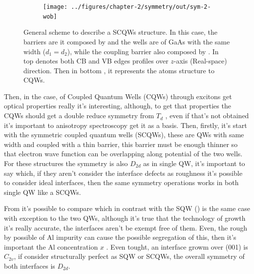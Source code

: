 \begin{figure}[h!]
	\centering
	\begin{subfigure}{\textwidth}
		\texttt{[image: ../figures/chapter-2/symmetry/out/sym-2-wob]}
		\label{subfig:subsubsec:chapter-2-scoupled-quantum-wells-a}
		\label{subfig:subsubsec:chapter-2-scoupled-quantum-wells-b}
	\end{subfigure}
	\caption
	{
		General scheme to describe a SCQWs structure. In this case, the barriers are it composed by \algaas and the wells are of GaAs with the same width ($d_{1}=d_{2}$), while the coupling barrier also composed by \algaas. In top  denotes both  CB and VB  edges profiles over $z$-axis (Real-space) direction. Then in bottom , it represents the atoms structure to CQWs. 
	}\label{fig:subsubsec:chapter-2-scoupled-quantum-wells}
\end{figure}

Then, in the case, of Coupled Quantum Wells (\gls{CQWs}) through excitons get optical properties really it's interesting, although, to get that properties the CQWs should get a double reduce symmetry from $T_{d}$ , even if that's not obtained it's important to anisotropy spectroscopy get it as a basis. 
Then, firstly, it's start with the symmetric coupled quantum wells (\gls{SCQWs}), these are QWs with same width and coupled with a thin barrier, this barrier must be enough thinner so that electron wave function can be overlapping along potential of the two wells. 
For these structures the symmetry is also $D_{2d}$ as in single QW, it's important to say which, if they aren't  consider the  interface defects as roughness it's possible to consider  ideal interfaces, then the same symmetry operations works in both single QW like a SCQWs. 

From  it's possible to compare which in contrast with the SQW () is the same case with exception to the two QWs, although it's true that the technology of growth it's really accurate, the interfaces aren't be exempt  free of them. Even, the rough by possible of Al impurity can cause the possible segregation of this, then it's important the Al concentration $x$ \cite{chand1990origin,tillmann2002direct}. Even tought, an interface growm over (001) is $C_{2v}$, if consider structurally perfect as \gls{SQW} or \gls{SCQWs}, the overall symmetry of both interfaces is $D_{2d}$\cite{magri2000anticrossing}.


